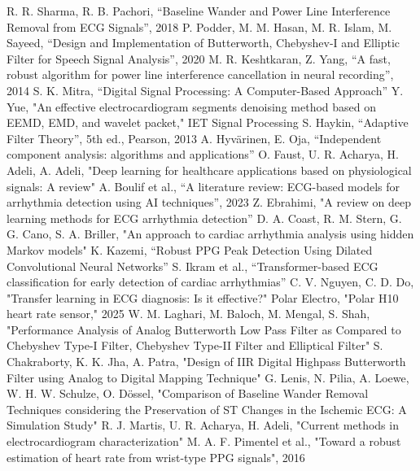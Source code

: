 \documentclass[journal]{IEEEtran}
\begin{document}
\newpage
\begin{thebibliography}{1}
R. R. Sharma, R. B. Pachori, “Baseline Wander and Power Line Interference Removal from ECG Signals”, 2018
P. Podder, M. M. Hasan, M. R. Islam, M. Sayeed, “Design and Implementation of Butterworth, Chebyshev-I and Elliptic Filter for Speech Signal Analysis”, 2020
M. R. Keshtkaran, Z. Yang, “A fast, robust algorithm for power line interference cancellation in neural recording”, 2014
S. K. Mitra, “Digital Signal Processing: A Computer-Based Approach”
Y. Yue, "An effective electrocardiogram segments denoising method based on EEMD, EMD, and wavelet packet," IET Signal Processing
S. Haykin, “Adaptive Filter Theory”, 5th ed., Pearson, 2013
A. Hyvärinen, E. Oja, “Independent component analysis: algorithms and applications”
O. Faust, U. R. Acharya, H. Adeli, A. Adeli, "Deep learning for healthcare applications based on physiological signals: A review"
A. Boulif et al., “A literature review: ECG-based models for arrhythmia detection using AI techniques”, 2023
Z. Ebrahimi, "A review on deep learning methods for ECG arrhythmia detection”
D. A. Coast, R. M. Stern, G. G. Cano, S. A. Briller, "An approach to cardiac arrhythmia analysis using hidden Markov models"
K. Kazemi, “Robust PPG Peak Detection Using Dilated Convolutional Neural Networks”
S. Ikram et al., “Transformer-based ECG classification for early detection of cardiac arrhythmias”
C. V. Nguyen, C. D. Do, "Transfer learning in ECG diagnosis: Is it effective?"
Polar Electro, "Polar H10 heart rate sensor," 2025
W. M. Laghari, M. Baloch, M. Mengal, S. Shah, "Performance Analysis of Analog Butterworth Low Pass Filter as Compared to Chebyshev Type-I Filter, Chebyshev Type-II Filter and Elliptical Filter"
S. Chakraborty, K. K. Jha, A. Patra, "Design of IIR Digital Highpass Butterworth Filter using Analog to Digital Mapping Technique"
G. Lenis, N. Pilia, A. Loewe, W. H. W. Schulze, O. Dössel, "Comparison of Baseline Wander Removal Techniques considering the Preservation of ST Changes in the Ischemic ECG: A Simulation Study"
R. J. Martis, U. R. Acharya, H. Adeli, "Current methods in electrocardiogram characterization"
M. A. F. Pimentel et al., "Toward a robust estimation of heart rate from wrist-type PPG signals", 2016
\end{thebibliography}
\end{document}
